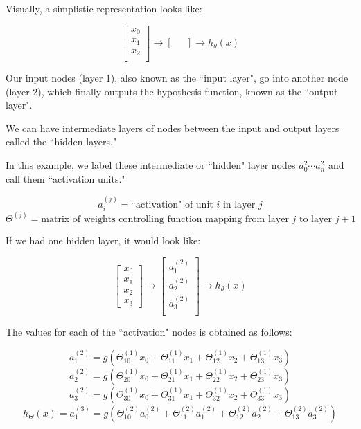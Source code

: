 \documentclass[UTF8]{article}
\begin{document}
Visually, a simplistic representation looks like:

\[ \begin{bmatrix}x_0 \\ x_1 \\ x_2 \\ \end{bmatrix}\rightarrow\begin{bmatrix}\ \ \ \\ \end{bmatrix}\rightarrow h_\theta(x) \]

Our input nodes (layer 1), also known as the ``input layer", go into another node (layer 2), which finally outputs the hypothesis function, known as the ``output layer".

We can have intermediate layers of nodes between the input and output layers called the ``hidden layers."

In this example, we label these intermediate or ``hidden" layer nodes $a^2_0 \cdots a^2_n$ and call them ``activation units."

\[ a_i^{(j)} = \text{``activation" of unit $i$ in layer $j$} \]
\[ \Theta^{(j)} = \text{matrix of weights controlling function mapping from layer $j$ to layer $j+1$} \]

If we had one hidden layer, it would look like:

\[\begin{bmatrix}x_0 \\ x_1 \\ x_2 \\ x_3\end{bmatrix}\rightarrow\begin{bmatrix}a_1^{(2)} \\ a_2^{(2)} \\ a_3^{(2)} \\ \end{bmatrix}\rightarrow h_\theta(x)\]

The values for each of the ``activation" nodes is obtained as follows:

\[ a_1^{(2)} = g(\Theta_{10}^{(1)}x_0 + \Theta_{11}^{(1)}x_1 + \Theta_{12}^{(1)}x_2 + \Theta_{13}^{(1)}x_3) \]
\[ a_2^{(2)} = g(\Theta_{20}^{(1)}x_0 + \Theta_{21}^{(1)}x_1 + \Theta_{22}^{(1)}x_2 + \Theta_{23}^{(1)}x_3) \]
\[ a_3^{(2)} = g(\Theta_{30}^{(1)}x_0 + \Theta_{31}^{(1)}x_1 + \Theta_{32}^{(1)}x_2 + \Theta_{33}^{(1)}x_3) \]
\[ h_\Theta(x) = a_1^{(3)} = g(\Theta_{10}^{(2)}a_0^{(2)} + \Theta_{11}^{(2)}a_1^{(2)} + \Theta_{12}^{(2)}a_2^{(2)} + \Theta_{13}^{(2)}a_3^{(2)}) \]
\end{document}
